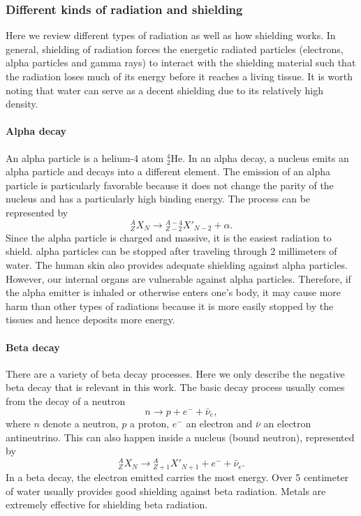 \documentclass[nofootinbib,preprint,aip,pra]{revtex4-1}
\begin{document}
        \subsubsection{Different kinds of radiation and shielding}
        Here we review different types of radiation as well as how shielding works. In general, shielding
        of radiation forces the energetic radiated particles (electrons, alpha particles and gamma rays) to
        interact with the shielding material such that the radiation loses much of its energy before it
        reaches a living tissue. It is worth noting that water can serve as a decent shielding due to its
        relatively high density.

        \paragraph{Alpha decay}
        An alpha particle is a helium-4 atom ${}^4_2$He. In an alpha decay, a nucleus emits an alpha
        particle and decays into a different element. The emission of an alpha particle is
        particularly favorable because it does not change the parity of the nucleus and has a particularly
        high binding energy. The process can be represented by
        \begin{equation}
            {}^A_Z X_N \rightarrow {}^{A-4}_{Z-2}X'_{N-2} + \alpha.
        \end{equation}
        Since the alpha particle is charged and massive, it is the easiest radiation to shield.
        alpha particles can be stopped after traveling through 2 millimeters of water. The human skin
        also provides adequate shielding against alpha particles. However, our internal organs are
        vulnerable against alpha particles. Therefore, if the alpha emitter is inhaled or otherwise enters
        one's body, it may cause more harm than other types of radiations because it is more easily stopped
        by the tissues and hence deposits more energy.

        \paragraph{Beta decay}
        There are a variety of beta decay processes. Here we only describe the negative beta decay that is
        relevant in this work. The basic decay process usually comes from the decay of a neutron
        \begin{equation}
            n \rightarrow p + e^- + \bar{\nu}_e,
        \end{equation}
        where $n$ denote  a neutron, $p$ a proton, $e^-$ an electron and $\bar{\nu}$ an electron antineutrino.
        This can also happen inside a nucleus (bound neutron), represented by
        \begin{equation}
            {}^A_Z X_N \rightarrow {}^A_{Z+1} X'_{N+1} + e^- + \bar{\nu}_e.
        \end{equation}
        In a beta decay, the electron emitted carries the most energy. Over 5 centimeter of water usually provides
        good shielding against beta radiation. Metals are extremely effective for shielding beta radiation.
        
\end{document}

